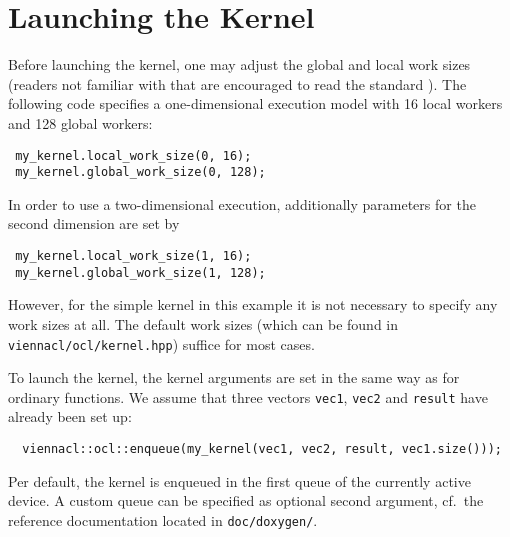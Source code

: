 \section{Launching the Kernel}
Before launching the kernel, one may adjust the global and local work sizes (readers not familiar with that are encouraged to read the {\OpenCL} standard \cite{khronoscl}).
The following code specifies a one-dimensional execution model with 16 local workers and 128 global workers:
\begin{lstlisting}
 my_kernel.local_work_size(0, 16);
 my_kernel.global_work_size(0, 128);
\end{lstlisting}
In order to use a two-dimensional execution, additionally parameters for the second dimension are set by
\begin{lstlisting}
 my_kernel.local_work_size(1, 16);
 my_kernel.global_work_size(1, 128);
\end{lstlisting}
However, for the simple kernel in this example it is not necessary to specify any work sizes at all. The default work sizes (which can be found in \texttt{viennacl/ocl/kernel.hpp}) suffice for most cases.

To launch the kernel, the kernel arguments are set in the same way as for ordinary functions. We assume that three {\ViennaCL} vectors \lstinline|vec1|, \lstinline|vec2| and \lstinline|result| have already been set up:
\begin{lstlisting}
  viennacl::ocl::enqueue(my_kernel(vec1, vec2, result, vec1.size()));
\end{lstlisting}
Per default, the kernel is enqueued in the first queue of the currently active device. A custom queue can be specified as optional second argument, cf.~the reference documentation
located in \texttt{doc/doxygen/}.
